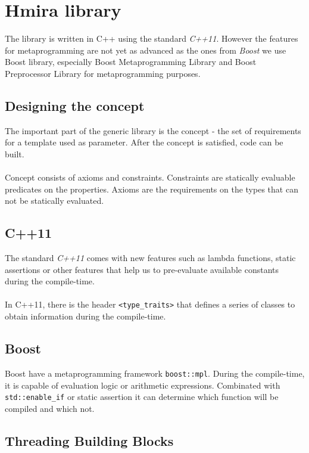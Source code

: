 \chapter{Hmira library}

The library is written in C++ using the standard \emph{C++11}\cite{Naugler2013}. However the features
for metaprogramming are not yet as advanced as the ones from \emph{Boost}\cite{Abrahams2004} we
use Boost library, especially Boost Metaprogramming Library\cite{bmpl}
and Boost Preprocessor Library\cite{bpl} for metaprogramming purposes.

\section{Designing the concept}

The important part of the generic library is the concept - the set of requirements for a template
used as parameter. After the concept is satisfied, code can be built.\\
\\
Concept consists of axioms and constraints\cite{Sutton2012}. Constraints are statically evaluable
predicates on the properties. Axioms are the requirements on the types that can not be statically
evaluated.

\section{C++11}

The standard \emph{C++11} comes with new features such as lambda functions, static assertions or other
features that help us to pre-evaluate available constants during the compile-time.\\
\\
In C++11, there is the header \texttt{\textless type\_traits\textgreater} that defines
a series of classes to obtain information during the compile-time.

\section{Boost}

Boost have a metaprogramming framework \texttt{boost::mpl}\cite{bmpl}. During the compile-time, it is
capable of evaluation logic or arithmetic expressions. Combinated with \texttt{std::enable\_if}
or static assertion it can determine which function will be compiled and which not.

\section{Threading Building Blocks}

